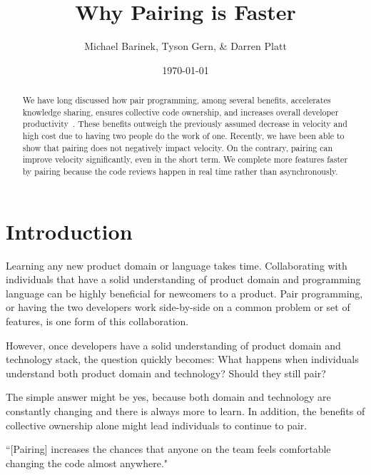 \documentclass[letterpaper]{article}
\title{Why Pairing is Faster}
\author{Michael Barinek, Tyson Gern, \& Darren Platt}
\date{\today}
\theoremstyle{definition}
\begin{document}
    \maketitle

    \begin{abstract}
        We have long discussed how pair programming, among several benefits, accelerates knowledge sharing, ensures
        collective code ownership, and increases overall developer productivity~\cite{fowler:pairing}.
        These benefits outweigh the previously assumed decrease in velocity and high cost due to having two people do
        the work of one.
        Recently, we have been able to show that pairing does not negatively impact velocity.
        On the contrary, pairing can improve velocity significantly, even in the short term.
        We complete more features faster by pairing because the code reviews happen in real time rather than
        asynchronously.
    \end{abstract}


    \section{Introduction}\label{sec:introduction}

    Learning any new product domain or language takes time.
    Collaborating with individuals that have a solid understanding of product domain and programming language can be
    highly beneficial for newcomers to a product.
    Pair programming, or having the two developers work side-by-side on a common problem or set of features, is one form
    of this collaboration.

    However, once developers have a solid understanding of product domain and technology stack, the question quickly
    becomes: What happens when individuals understand both product domain and technology?
    Should they still pair?

    The simple answer might be yes, because both domain and technology are constantly changing and there is always more
    to learn.
    In addition, the benefits of collective ownership alone might lead individuals to continue to pair.

    \begin{displayquote}
        ``{[Pairing]} increases the chances that anyone on the team feels comfortable changing the code almost anywhere."
    \end{displayquote}
\end{document}

